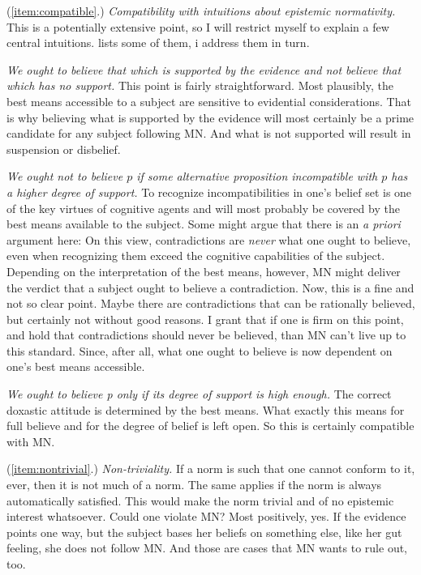 \documentclass[12pt,numbers=noenddot]{scrartcl}
\begin{document}
(\ref{item:compatible}.) \emph{Compatibility with intuitions about epistemic normativity.}
This is a potentially extensive point, so I will restrict myself to explain a few central intuitions. \textcite[39]{Boghossian2003-BOGTNO} lists some of them, i address them in turn.

\emph{We ought to believe that which is supported by the evidence and not believe that which has no support.} This point is fairly straightforward. Most plausibly, the best means accessible to a subject are sensitive to evidential considerations. That is why believing what is supported by the evidence will most certainly be a prime candidate for any subject following MN. And what is not supported will result in suspension or disbelief.

\emph{ We ought not to believe $p$ if some alternative proposition incompatible with $p$ has a higher degree of support.} To recognize incompatibilities in one's belief set is one of the key virtues of cognitive agents and will most probably be covered by the best means available to the subject. Some might argue that there is an \emph{a priori} argument here: On this view, contradictions are \emph{never} what one ought to believe, even when recognizing them exceed the cognitive capabilities of the subject. Depending on the interpretation of the best means, however, MN might deliver the verdict that a subject ought to believe a contradiction. Now, this is a fine and not so clear point. Maybe there are contradictions that can be rationally believed, but certainly not without good reasons. I grant that if one is firm on this point, and hold that contradictions should never be believed, than MN can't live up to this standard. Since, after all, what one ought to believe is now dependent on one's best means accessible.

\emph{We ought to believe p only if its degree of support is high enough.} The correct doxastic attitude is determined by the best means. What exactly this means for full believe and for the degree of belief is left open. So this is certainly compatible with MN.

(\ref{item:nontrivial}.) \emph{Non-triviality.}
If a norm is such that one cannot conform to it, ever, then it is not much of a norm. The same applies if the norm is always automatically satisfied. This would make the norm trivial and of no epistemic interest whatsoever. Could one violate MN? Most positively, yes. If the evidence points one way, but the subject bases her beliefs on something else, like her gut feeling, she does not follow MN. And those are cases that MN wants to rule out, too. 
\end{document}
